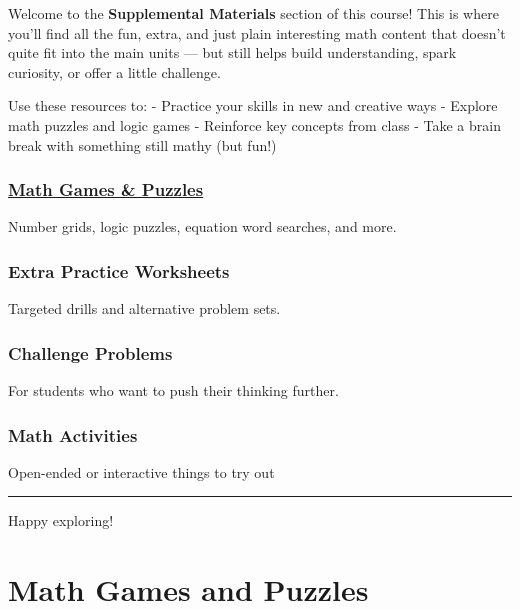 \documentclass[
  letterpaper,
]{scrrept}
\begin{document}
Welcome to the \textbf{Supplemental Materials} section of this course!
This is where you'll find all the fun, extra, and just plain interesting
math content that doesn't quite fit into the main units --- but still
helps build understanding, spark curiosity, or offer a little challenge.

Use these resources to: - Practice your skills in new and creative ways
- Explore math puzzles and logic games - Reinforce key concepts from
class - Take a brain break with something still mathy (but fun!)

\subsection*{\texorpdfstring{\href{math_games_and_puzzles/index.md}{Math
Games \& Puzzles}}{Math Games \& Puzzles}}\label{math-games-puzzles}

Number grids, logic puzzles, equation word searches, and more.

\subsection*{Extra Practice Worksheets}\label{extra-practice-worksheets}

Targeted drills and alternative problem sets.

\subsection*{Challenge Problems}\label{challenge-problems}

For students who want to push their thinking further.

\subsection*{Math Activities}\label{math-activities}

Open-ended or interactive things to try out

\begin{center}\rule{0.5\linewidth}{0.5pt}\end{center}

Happy exploring!

\chapter*{Math Games and Puzzles}\label{math-games-and-puzzles}
\end{document}
